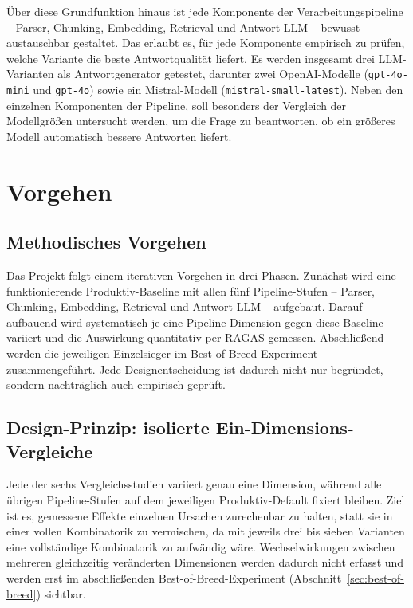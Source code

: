 \documentclass[11pt,a4paper]{article}
\begin{document}
Über diese Grundfunktion hinaus ist jede Komponente der Verarbeitungspipeline
-- Parser, Chunking, Embedding, Retrieval und Antwort-LLM -- bewusst
austauschbar gestaltet. Das erlaubt es, für jede Komponente empirisch zu
prüfen, welche Variante die beste Antwortqualität liefert. Es werden insgesamt drei LLM-Varianten als Antwortgenerator getestet, darunter zwei OpenAI-Modelle
(\texttt{gpt-4o-mini} und \texttt{gpt-4o}) sowie ein Mistral-Modell
(\texttt{mistral-small-latest}). Neben den einzelnen Komponenten der Pipeline, soll besonders der Vergleich der Modellgrößen untersucht werden, um die Frage zu beantworten, ob ein größeres Modell automatisch bessere Antworten liefert.
\section{Vorgehen}
\label{sec:vorgehen}

\subsection{Methodisches Vorgehen}

Das Projekt folgt einem iterativen Vorgehen in drei Phasen. Zunächst wird
eine funktionierende Produktiv-Baseline mit allen fünf Pipeline-Stufen --
Parser, Chunking, Embedding, Retrieval und Antwort-LLM -- aufgebaut. Darauf
aufbauend wird systematisch je eine Pipeline-Dimension gegen diese Baseline
variiert und die Auswirkung quantitativ per RAGAS gemessen. Abschließend
werden die jeweiligen Einzelsieger im Best-of-Breed-Experiment
zusammengeführt. Jede Designentscheidung ist dadurch nicht nur begründet,
sondern nachträglich auch empirisch geprüft.

\subsection{Design-Prinzip: isolierte Ein-Dimensions-Vergleiche}

Jede der sechs Vergleichsstudien variiert genau eine Dimension, während alle
übrigen Pipeline-Stufen auf dem jeweiligen Produktiv-Default fixiert bleiben.
Ziel ist es, gemessene Effekte einzelnen Ursachen zurechenbar zu halten,
statt sie in einer vollen Kombinatorik zu vermischen, da mit jeweils drei bis sieben Varianten eine vollständige Kombinatorik zu aufwändig wäre.
Wechselwirkungen zwischen mehreren gleichzeitig veränderten Dimensionen werden dadurch nicht
erfasst und werden erst im abschließenden Best-of-Breed-Experiment
(Abschnitt~\ref{sec:best-of-breed}) sichtbar.
\end{document}
